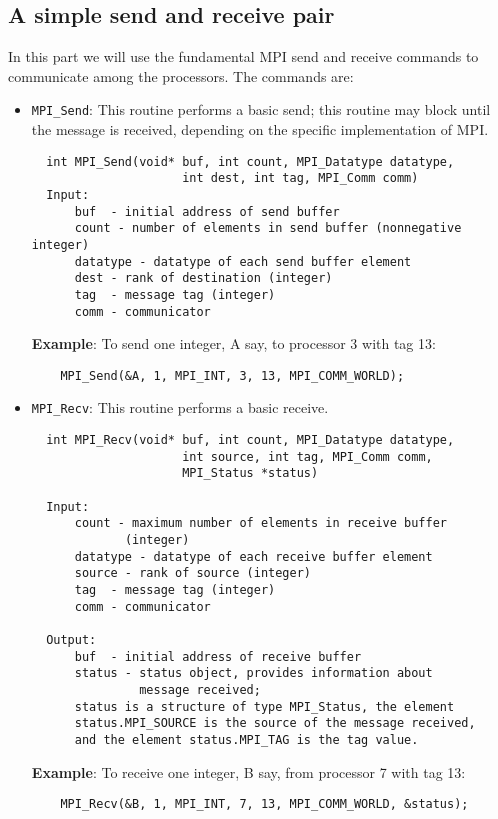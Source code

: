 \documentclass[12pt]{article}
\begin{document}
\subsection*{A simple send and receive pair}
In this part we will use the fundamental MPI send and receive commands
to communicate among the processors. The commands are:
\begin{itemize}
  \item \texttt{MPI\_Send}:
  This routine performs a basic send; this routine may block until
  the message
  is received, depending on the specific implementation of MPI.
  \begin{verbatim}
  int MPI_Send(void* buf, int count, MPI_Datatype datatype,
                     int dest, int tag, MPI_Comm comm)
  Input:
      buf  - initial address of send buffer
      count - number of elements in send buffer (nonnegative integer)
      datatype - datatype of each send buffer element
      dest - rank of destination (integer)
      tag  - message tag (integer)
      comm - communicator
  \end{verbatim}
  \textbf{Example}: To send one integer, A say, to processor 3 with tag 13:
  \begin{verbatim}
    MPI_Send(&A, 1, MPI_INT, 3, 13, MPI_COMM_WORLD);
  \end{verbatim}
  \item \texttt{MPI\_Recv}:
    This routine performs a basic receive.
  \begin{verbatim}
  int MPI_Recv(void* buf, int count, MPI_Datatype datatype,
                     int source, int tag, MPI_Comm comm,
                     MPI_Status *status)

  Input:
      count - maximum number of elements in receive buffer
             (integer)
      datatype - datatype of each receive buffer element
      source - rank of source (integer)
      tag  - message tag (integer)
      comm - communicator

  Output:
      buf  - initial address of receive buffer
      status - status object, provides information about
               message received;
      status is a structure of type MPI_Status, the element
      status.MPI_SOURCE is the source of the message received,
      and the element status.MPI_TAG is the tag value.

  \end{verbatim}
  \textbf{Example}: To receive one integer, B say, from processor 7
  with tag 13:
  \begin{verbatim}
    MPI_Recv(&B, 1, MPI_INT, 7, 13, MPI_COMM_WORLD, &status);
  \end{verbatim}
\end{itemize}
\end{document}
